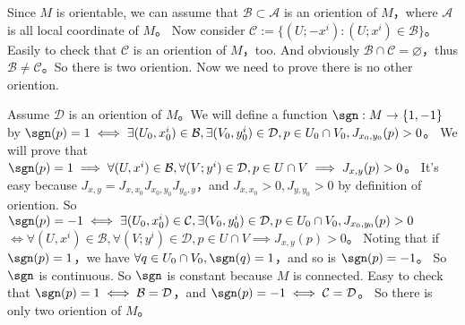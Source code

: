 \documentclass{ctexart}
\begin{document}
\begin{solution}
  Since \(M\) is orientable, we can assume that \(\mathcal{B} \subset \mathcal{A}\) is an oriention of \(M\)\nolinebreak[4]，where \(\mathcal{A}\) is all local coordinate of \(M\)\nolinebreak[4]。
  Now consider \(\mathcal{C}:=\{(U;-x^i):(U;x^i) \in \mathcal{B}\}\)\nolinebreak[4]。Easily to check that \(\mathcal{C}\) is an oriention of \(M\)\nolinebreak[4]，too.
  And obviously \(\mathcal{B} \cap \mathcal{C} = \varnothing\)\nolinebreak[4]，thus \(\mathcal{B} \neq \mathcal{C}\)\nolinebreak[4]。So there is two oriention. Now we need to prove there is no other oriention.

  Assume \(\mathcal{D}\) is an oriention of \(M\)\nolinebreak[4]。We will define a function \(\sgn:M \to \{1,-1\}\) by
  \(\sgn(p)=1 \iff \exists (U_0,x_0^i) \in \mathcal{B},\exists (V_0,y_0^i) \in \mathcal{D},p \in U_0 \cap V_0,J_{x_0,y_0}(p)>0\)\nolinebreak[4]。
  We will prove that \(\sgn(p)=1 \implies \forall (U,x^i) \in \mathcal{B},\forall (V;y^i) \in \mathcal{D},p \in U \cap V \implies J_{x,y}(p)>0\)\nolinebreak[4]。
  It's easy because \(J_{x,y}=J_{x,x_0}J_{x_0,y_0}J_{y_0,y}\)\nolinebreak[4]，and \(J_{x,x_0}>0,J_{y,y_0}>0\) by definition of oriention.
  So \(\sgn(p)=-1 \iff \exists (U_0,x_0^i) \in \mathcal{C},\exists (V_0,y_0^i) \in \mathcal{D},p \in U_0 \cap V_0,J_{x_0,y_0}(p)>0 \)
  \(\iff \forall (U,x^i) \in \mathcal{B},\forall (V;y^i) \in \mathcal{D},p \in U \cap V \implies J_{x,y}(p)>0 \)\nolinebreak[4]。
  Noting that if \(\sgn(p)=1\)\nolinebreak[4]，we have \(\forall q \in U_0 \cap V_0,\sgn(q)=1\)\nolinebreak[4]，and so is \(\sgn(p)=-1\)\nolinebreak[4]。
  So \(\sgn\) is continuous. So \(\sgn\) is constant because \(M\) is connected.
  Easy to check that \(\sgn(p)=1 \iff \mathcal{B}=\mathcal{D}\)\nolinebreak[4]，and \(\sgn(p)=-1 \iff \mathcal{C}=\mathcal{D}\)\nolinebreak[4]。
  So there is only two oriention of \(M\)\nolinebreak[4]。
\end{solution}
\end{document}
